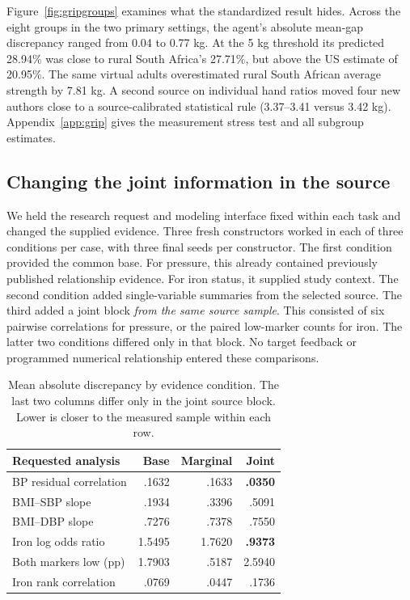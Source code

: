 \documentclass[sigconf,anonymous,review]{acmart}
\begin{document}
Figure~\ref{fig:gripgroups} examines what the standardized result hides. Across the eight groups in the two primary settings, the agent's absolute mean-gap discrepancy ranged from 0.04 to 0.77 kg. At the 5 kg threshold its predicted 28.94\% was close to rural South Africa's 27.71\%, but above the US estimate of 20.95\%. The same virtual adults overestimated rural South African average strength by 7.81 kg. A second source on individual hand ratios moved four new authors close to a source-calibrated statistical rule (3.37--3.41 versus 3.42 kg). Appendix~\ref{app:grip} gives the measurement stress test and all subgroup estimates.

\subsection{Changing the joint information in the source}
\label{sec:controlled}
We held the research request and modeling interface fixed within each task and changed the supplied evidence. Three fresh constructors worked in each of three conditions per case, with three final seeds per constructor. The first condition provided the common base. For pressure, this already contained previously published relationship evidence. For iron status, it supplied study context. The second condition added single-variable summaries from the selected source. The third added a joint block \emph{from the same source sample}. This consisted of six pairwise correlations for pressure, or the paired low-marker counts for iron. The latter two conditions differed only in that block. No target feedback or programmed numerical relationship entered these comparisons.

\begin{table}[t]
\caption{Mean absolute discrepancy by evidence condition. The last two columns differ only in the joint source block. Lower is closer to the measured sample within each row.}
\label{tab:evidence}
\centering
\begin{tabular}{@{}lrrr@{}}
\toprule
Requested analysis & Base & Marginal & Joint\\
\midrule
BP residual correlation & .1632 & .1633 & \textbf{.0350}\\
BMI--SBP slope & .1934 & .3396 & .5091\\
BMI--DBP slope & .7276 & .7378 & .7550\\
Iron log odds ratio & 1.5495 & 1.7620 & \textbf{.9373}\\
Both markers low (pp) & 1.7903 & .5187 & 2.5940\\
Iron rank correlation & .0769 & .0447 & .1736\\
\bottomrule
\end{tabular}
\end{table}
\end{document}
